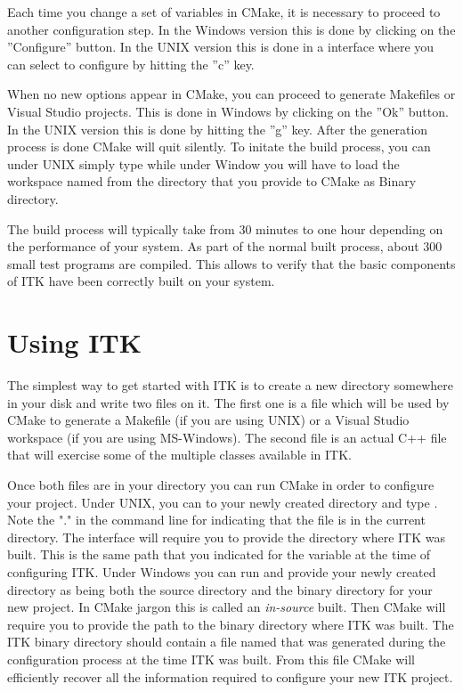 Each time you change a set of variables in CMake, it is necessary to proceed
to another configuration step. In the Windows version this is done by
clicking on the ''Configure'' button. In the UNIX version this is done in a
 interface where you can select to configure by hitting the
''c'' key.

When no new options appear in CMake, you can proceed to generate Makefiles or
Visual Studio projects. This is done in Windows by clicking on the ''Ok''
button.  In the UNIX version this is done by hitting the ''g'' key. After the
generation process is done CMake will quit silently. To initate the build
process, you can under UNIX simply type  while under Window you
will have to load the workspace named  from the directory that
you provide to CMake as Binary directory.

The build process will typically take from 30 minutes to one hour depending
on the performance of your system. As part of the normal built process, about
300 small test programs are compiled. This allows to verify that the basic
components of ITK have been correctly built on your system.

\section{Using ITK }
\label{sec:UsingITK}
 
The simplest way to get started with ITK is to create a new directory
somewhere in your disk and write two files on it. The first one is a
 file which will be used by CMake to generate a Makefile
(if you are using UNIX) or a Visual Studio workspace (if you are using
MS-Windows).  The second file is an actual C++ file that will exercise some of
the multiple classes available in ITK.

Once both files are in your directory you can run CMake in order to configure
your project. Under UNIX, you can  to your newly created directory
and type . Note the "." in the command line for indicating
that the  file is in the current directory. The
 interface will require you to provide the directory where ITK
was built. This is the same path that you indicated for the
 variable at the time of configuring ITK. Under
Windows you can run  and provide your newly created
directory as being both the source directory and the binary directory for
your new project. In CMake jargon this is called an
\emph{in-source} built. Then CMake will require you to provide the path to the
binary directory where ITK was built. The ITK binary directory should contain a
file named  that was generated during the configuration
process at the time ITK was built.  From this file CMake will efficiently
recover all the information required to configure your new ITK project.  

